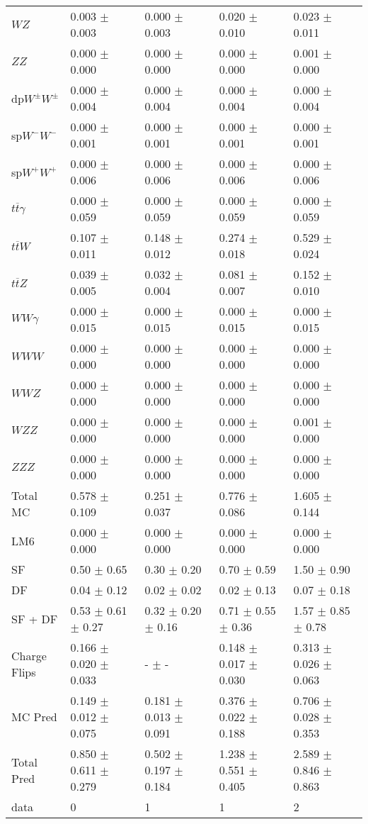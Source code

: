 \begin{tabular}{l | l l l l}
$WZ$ &  0.003 $\pm$  0.003 &   0.000 $\pm$  0.003 &  0.020 $\pm$  0.010 &  0.023 $\pm$  0.011\\
$ZZ$ &   0.000 $\pm$   0.000 &  0.000 $\pm$   0.000 &   0.000 $\pm$   0.000 &  0.001 $\pm$   0.000\\
\hline
dp$W^{\pm}W^{\pm}$ &  0.000 $\pm$  0.004 &  0.000 $\pm$  0.004 &  0.000 $\pm$  0.004 &  0.000 $\pm$  0.004\\
sp$W^{-}W^{-}$ &  0.000 $\pm$  0.001 &  0.000 $\pm$  0.001 &  0.000 $\pm$  0.001 &  0.000 $\pm$  0.001\\
sp$W^{+}W^{+}$ &  0.000 $\pm$  0.006 &  0.000 $\pm$  0.006 &  0.000 $\pm$  0.006 &  0.000 $\pm$  0.006\\
$t\overline{t}\gamma$ &  0.000 $\pm$  0.059 &  0.000 $\pm$  0.059 &  0.000 $\pm$  0.059 &  0.000 $\pm$  0.059\\
$t\overline{t}W$ &  0.107 $\pm$  0.011 &  0.148 $\pm$  0.012 &  0.274 $\pm$  0.018 &  0.529 $\pm$  0.024\\
$t\overline{t}Z$ &  0.039 $\pm$  0.005 &  0.032 $\pm$  0.004 &  0.081 $\pm$  0.007 &  0.152 $\pm$  0.010\\
$WW\gamma$ &  0.000 $\pm$  0.015 &  0.000 $\pm$  0.015 &  0.000 $\pm$  0.015 &  0.000 $\pm$  0.015\\
$WWW$ &   0.000 $\pm$   0.000 &  0.000 $\pm$   0.000 &   0.000 $\pm$   0.000 &   0.000 $\pm$   0.000\\
$WWZ$ &  0.000 $\pm$   0.000 &  0.000 $\pm$   0.000 &  0.000 $\pm$   0.000 &  0.000 $\pm$   0.000\\
$WZZ$ &   0.000 $\pm$   0.000 &   0.000 $\pm$   0.000 &   0.000 $\pm$   0.000 &  0.001 $\pm$   0.000\\
$ZZZ$ &   0.000 $\pm$   0.000 &   0.000 $\pm$   0.000 &   0.000 $\pm$   0.000 &   0.000 $\pm$   0.000\\
\hline
Total MC &  0.578 $\pm$  0.109 &  0.251 $\pm$  0.037 &  0.776 $\pm$  0.086 &  1.605 $\pm$  0.144\\
\hline\hline
\hline
LM6 &  0.000 $\pm$  0.000 &  0.000 $\pm$  0.000 &  0.000 $\pm$  0.000 &  0.000 $\pm$  0.000\\
\hline\hline
\hline\hline
 SF  & 0.50 $\pm$ 0.65 & 0.30 $\pm$ 0.20 & 0.70 $\pm$ 0.59 & 1.50 $\pm$ 0.90\\
 DF  & 0.04 $\pm$ 0.12 & 0.02 $\pm$ 0.02 & 0.02 $\pm$ 0.13 & 0.07 $\pm$ 0.18\\
\hline
 SF + DF  & 0.53 $\pm$ 0.61 $\pm$ 0.27 & 0.32 $\pm$ 0.20 $\pm$ 0.16 & 0.71 $\pm$ 0.55 $\pm$ 0.36 & 1.57 $\pm$ 0.85 $\pm$ 0.78\\
\hline\hline
Charge Flips & 0.166 $\pm$ 0.020 $\pm$ 0.033 & - $\pm$ - & 0.148 $\pm$ 0.017 $\pm$ 0.030 & 0.313 $\pm$ 0.026 $\pm$ 0.063\\
\hline\hline
\hline
MC Pred &  0.149 $\pm$  0.012 $\pm$  0.075 &  0.181 $\pm$  0.013 $\pm$  0.091 &  0.376 $\pm$  0.022 $\pm$  0.188 &  0.706 $\pm$  0.028 $\pm$  0.353\\
\hline\hline
Total Pred &  0.850 $\pm$  0.611 $\pm$  0.279 &  0.502 $\pm$  0.197 $\pm$  0.184 &  1.238 $\pm$  0.551 $\pm$  0.405 &  2.589 $\pm$  0.846 $\pm$  0.863\\
\hline\hline
data & 0 & 1 & 1 & 2\\
\hline\hline
\end{tabular}

